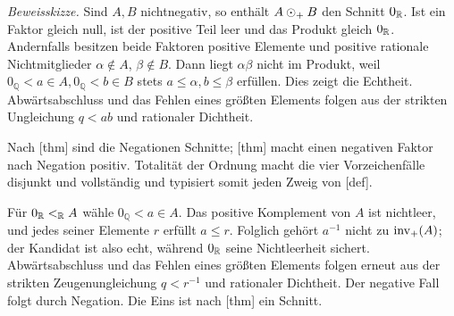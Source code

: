 \documentclass[main.tex]{subfiles}
\begin{document}

\emph{Beweisskizze.}
Sind \(A,B\) nichtnegativ, so enthält \(A\mathbin{\odot_{+}} B\) den Schnitt
\(0_{\mathbb R}\). Ist ein Faktor gleich null, ist der positive Teil leer und das
Produkt gleich \(0_{\mathbb R}\). Andernfalls besitzen beide Faktoren positive
Elemente und positive rationale Nichtmitglieder \(\alpha\notin A\),
\(\beta\notin B\). Dann liegt \(\alpha\beta\) nicht im Produkt, weil
\(0_{\mathbb Q}<a\in A,0_{\mathbb Q}<b\in B\) stets
\(a\leq\alpha,b\leq\beta\) erfüllen. Dies zeigt
die Echtheit. Abwärtsabschluss und das Fehlen eines größten Elements folgen
aus der strikten Ungleichung \(q<ab\) und rationaler Dichtheit.

Nach [thm] sind die Negationen
Schnitte; [thm] macht einen negativen
Faktor nach Negation positiv. Totalität der Ordnung macht die vier
Vorzeichenfälle disjunkt und vollständig und typisiert somit jeden Zweig von
[def].

Für \(0_{\mathbb R}\mathrel{<_{\mathbb R}} A\) wähle \(0_{\mathbb Q}<a\in A\). Das positive
Komplement von \(A\) ist nichtleer, und jedes seiner Elemente \(r\) erfüllt
\(a\leq r\). Folglich gehört \(a^{-1}\) nicht zu \(\operatorname{inv}_{+}\!\left(A\right)\); der
Kandidat ist also echt, während \(0_{\mathbb R}\) seine Nichtleerheit sichert.
Abwärtsabschluss und das Fehlen eines größten Elements folgen erneut aus der
strikten Zeugenungleichung \(q<r^{-1}\) und rationaler Dichtheit. Der negative
Fall folgt durch Negation. Die Eins ist nach
[thm] ein Schnitt.

\end{document}
